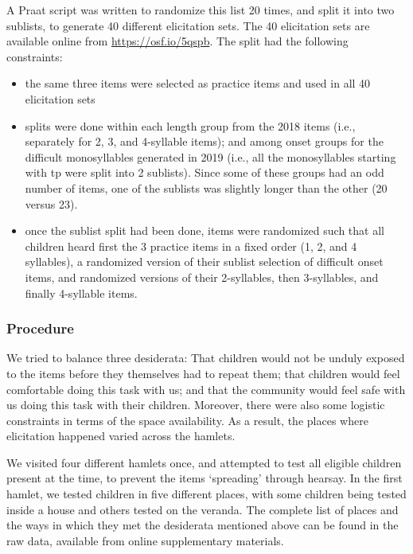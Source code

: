 \documentclass[english,,man,floatsintext]{apa6}
\providecommand{\tightlist}{%
  \setlength{\itemsep}{0pt}\setlength{\parskip}{0pt}}
\begin{document}
A Praat script was written to randomize this list 20 times, and split it
into two sublists, to generate 40 different elicitation sets. The 40
elicitation sets are available online from \url{https://osf.io/5qspb}.
The split had the following constraints:

\begin{itemize}
\tightlist
\item
  the same three items were selected as practice items and used in all
  40 elicitation sets
\item
  splits were done within each length group from the 2018 items (i.e.,
  separately for 2, 3, and 4-syllable items); and among onset groups for
  the difficult monosyllables generated in 2019 (i.e., all the
  monosyllables starting with tp were split into 2 sublists). Since some
  of these groups had an odd number of items, one of the sublists was
  slightly longer than the other (20 versus 23).
\item
  once the sublist split had been done, items were randomized such that
  all children heard first the 3 practice items in a fixed order (1, 2,
  and 4 syllables), a randomized version of their sublist selection of
  difficult onset items, and randomized versions of their 2-syllables,
  then 3-syllables, and finally 4-syllable items.
\end{itemize}

\subsubsection{Procedure}\label{procedure}

We tried to balance three desiderata: That children would not be unduly
exposed to the items before they themselves had to repeat them; that
children would feel comfortable doing this task with us; and that the
community would feel safe with us doing this task with their children.
Moreover, there were also some logistic constraints in terms of the
space availability. As a result, the places where elicitation happened
varied across the hamlets.

We visited four different hamlets once, and attempted to test all
eligible children present at the time, to prevent the items `spreading'
through hearsay. In the first hamlet, we tested children in five
different places, with some children being tested inside a house and
others tested on the veranda. The complete list of places and the ways
in which they met the desiderata mentioned above can be found in the raw
data, available from online supplementary materials.
\end{document}
